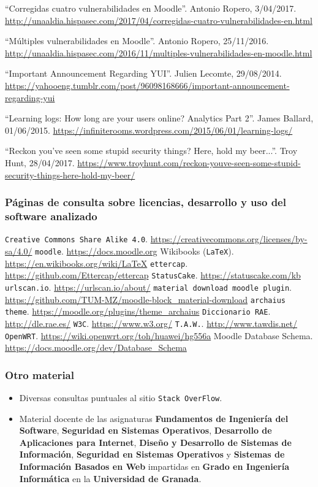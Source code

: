  ``Corregidas cuatro vulnerabilidades en Moodle''. Antonio Ropero, 3/04/2017. \url{http://unaaldia.hispasec.com/2017/04/corregidas-cuatro-vulnerabilidades-en.html}

 ``Múltiples vulnerabilidades en Moodle''. Antonio Ropero, 25/11/2016. \url{http://unaaldia.hispasec.com/2016/11/multiples-vulnerabilidades-en-moodle.html}

 ``Important Announcement Regarding YUI''. Julien Lecomte, 29/08/2014. \url{https://yahooeng.tumblr.com/post/96098168666/important-announcement-regarding-yui}

 ``Learning logs: How long are your users online? Analytics Part 2''. James Ballard, 01/06/2015. \url{https://infiniterooms.wordpress.com/2015/06/01/learning-logs/}

 ``Reckon you've seen some stupid security things? Here, hold my beer...''. Troy Hunt, 28/04/2017. \url{https://www.troyhunt.com/reckon-youve-seen-some-stupid-security-things-here-hold-my-beer/}

\bigskip
\subsubsection*{Páginas de consulta sobre licencias, desarrollo y uso del software analizado}
 {\tt Creative Commons Share Alike 4.0}. \url{https://creativecommons.org/licenses/by-sa/4.0/}
 {\tt moodle}. \url{https://docs.moodle.org}
 Wikibooks ({\tt LaTeX}). \url{https://en.wikibooks.org/wiki/LaTeX}
 {\tt ettercap}. \url{https://github.com/Ettercap/ettercap}
 {\tt StatusCake}. \url{https://statuscake.com/kb}
 {\tt urlscan.io}. \url{https://urlscan.io/about/}
 {\tt material download moodle plugin}. \url{https://github.com/TUM-MZ/moodle-block_material-download}
 {\tt archaius theme}. \url{https://moodle.org/plugins/theme_archaius}
 {\tt Diccionario RAE}. \url{http://dle.rae.es/}
 {\tt W3C}. \url{https://www.w3.org/}
 {\tt T.A.W.}. \url{http://www.tawdis.net/}
 {\tt OpenWRT}. \url{https://wiki.openwrt.org/toh/huawei/hg556a}
 Moodle Database Schema. \url{https://docs.moodle.org/dev/Database_Schema}


\bigskip
\subsubsection*{Otro material}
\begin{itemize}
	\item Diversas consultas puntuales al sitio {\tt Stack OverFlow}.
	\item Material docente de las asignaturas \textbf{Fundamentos de Ingeniería del Software}, \textbf{Seguridad en Sistemas Operativos}, \textbf{Desarrollo de Aplicaciones para Internet}, \textbf{Diseño y Desarrollo de Sistemas de Información}, \textbf{Seguridad en Sistemas Operativos} y \textbf{Sistemas de Información Basados en Web} impartidas en \textbf{Grado en Ingeniería Informática} en la \textbf{Universidad de Granada}.
\end{itemize}
